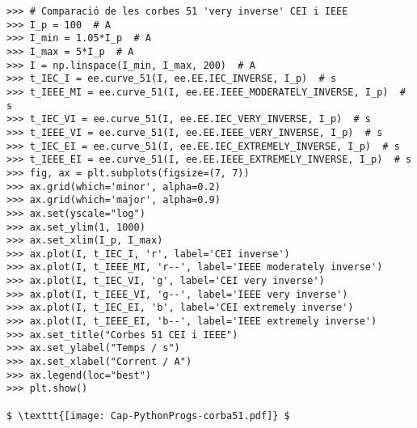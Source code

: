 \begin{lstlisting}[mathescape=true]
>>> # Comparació de les corbes 51 'very inverse' CEI i IEEE
>>> I_p = 100  # A
>>> I_min = 1.05*I_p  # A
>>> I_max = 5*I_p  # A
>>> I = np.linspace(I_min, I_max, 200)  # A
>>> t_IEC_I = ee.curve_51(I, ee.EE.IEC_INVERSE, I_p)  # s
>>> t_IEEE_MI = ee.curve_51(I, ee.EE.IEEE_MODERATELY_INVERSE, I_p)  # s
>>> t_IEC_VI = ee.curve_51(I, ee.EE.IEC_VERY_INVERSE, I_p)  # s
>>> t_IEEE_VI = ee.curve_51(I, ee.EE.IEEE_VERY_INVERSE, I_p)  # s
>>> t_IEC_EI = ee.curve_51(I, ee.EE.IEC_EXTREMELY_INVERSE, I_p)  # s
>>> t_IEEE_EI = ee.curve_51(I, ee.EE.IEEE_EXTREMELY_INVERSE, I_p)  # s
>>> fig, ax = plt.subplots(figsize=(7, 7))
>>> ax.grid(which='minor', alpha=0.2)
>>> ax.grid(which='major', alpha=0.9)
>>> ax.set(yscale="log")
>>> ax.set_ylim(1, 1000)
>>> ax.set_xlim(I_p, I_max)
>>> ax.plot(I, t_IEC_I, 'r', label='CEI inverse')
>>> ax.plot(I, t_IEEE_MI, 'r--', label='IEEE moderately inverse')
>>> ax.plot(I, t_IEC_VI, 'g', label='CEI very inverse')
>>> ax.plot(I, t_IEEE_VI, 'g--', label='IEEE very inverse')
>>> ax.plot(I, t_IEC_EI, 'b', label='CEI extremely inverse')
>>> ax.plot(I, t_IEEE_EI, 'b--', label='IEEE extremely inverse')
>>> ax.set_title("Corbes 51 CEI i IEEE")
>>> ax.set_ylabel("Temps / s")
>>> ax.set_xlabel("Corrent / A")
>>> ax.legend(loc="best")
>>> plt.show()

$ \texttt{[image: Cap-PythonProgs-corba51.pdf]} $
\end{lstlisting}



